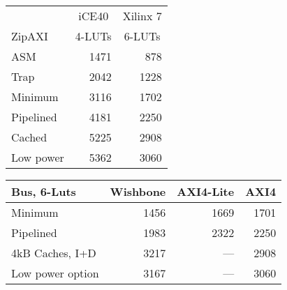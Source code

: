 \documentclass{article}
\begin{document}
\begin{center}\begin{tabular}{|l|r|r|}\hline
 & \multicolumn{1}{c|}{iCE40} & \multicolumn{1}{|c|}{Xilinx 7} \\
ZipAXI & \multicolumn{1}{c|}{4-LUTs} & \multicolumn{1}{|c|}{6-LUTs}\\\hline\hline
ASM			& 1471 &  878 \\\hline
Trap			& 2042 & 1228 \\\hline
Minimum			& 3116 & 1702 \\\hline
Pipelined		& 4181 & 2250 \\\hline
Cached			& 5225 & 2908 \\\hline
Low power		& 5362 & 3060 \\\hline
\end{tabular}\end{center}


\begin{center}\begin{tabular}{|l|r|r|r|}\hline
Bus, 6-Luts & \multicolumn{1}{|c|}{Wishbone} & \multicolumn{1}{|c|}{AXI4-Lite}
		& \multicolumn{1}{|c|}{AXI4} \\\hline\hline
Minimum			& 1456 & 1669 & 1701 \\\hline
Pipelined		& 1983 & 2322 & 2250 \\\hline
4kB Caches, I+D		& 3217 &  --- & 2908 \\\hline
Low power option	& 3167 &  --- & 3060 \\\hline
\end{tabular}\end{center}
\end{document}
